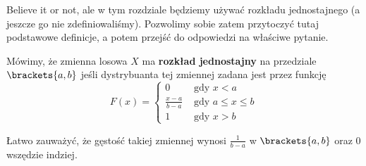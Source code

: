 Believe it or not, ale w tym rozdziale będziemy używać rozkładu jednostajnego (a jeszcze go nie zdefiniowaliśmy). Pozwolimy sobie zatem przytoczyć tutaj podstawowe definicje, a potem przejść do odpowiedzi na właściwe pytanie. 

\begin{definition}
    Mówimy, że zmienna losowa \( X \) ma \textbf{rozkład jednostajny} na przedziale \( \brackets{a, b} \) jeśli dystrybuanta tej zmiennej zadana jest przez funkcję
    \[
        F(x) = \begin{cases}
            0 & \text{ gdy } x < a \\
            \frac{x - a}{b - a} & \text{ gdy } a \leq x \leq b \\
            1 & \text{ gdy } x > b
        \end{cases}
    \]
\end{definition}
Łatwo zauważyć, że gęstość takiej zmiennej wynosi \( \frac{1}{b-a} \) w \( \brackets{a, b} \) oraz 0 wszędzie indziej.
